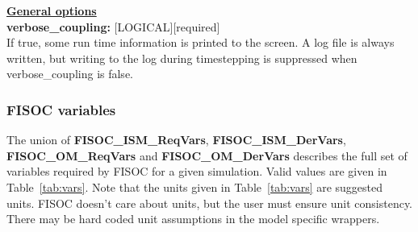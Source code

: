 \documentclass[11pt]{article}
\begin{document}
\begin{flushleft}

\textbf{\underline{General options}}                                       \\
\textbf{verbose\_coupling:}  [LOGICAL][required]                           \\
If true, some run time information is printed to the screen.  
A log file is always 
written, but writing to the log during timestepping is suppressed when 
verbose\_coupling is false.\\
\end{flushleft}



\subsubsection{FISOC variables}
\label{sec:FISOCvars}

The union of \textbf{FISOC\_ISM\_ReqVars}, \textbf{FISOC\_ISM\_DerVars}, \textbf{FISOC\_OM\_ReqVars} 
and \textbf{FISOC\_OM\_DerVars} describes the full set of variables required by FISOC for a given simulation. 
Valid values are given in Table~\ref{tab:vars}.
Note that the units given in Table~\ref{tab:vars} are suggested units.  FISOC doesn't care about units, but 
the user must ensure unit consistency.  There may be hard coded unit assumptions in the model specific 
wrappers.
\end{document}
